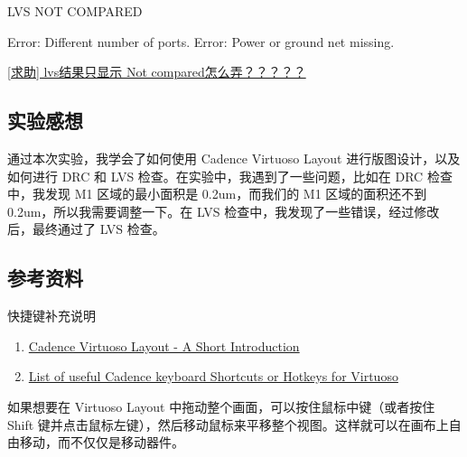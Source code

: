 \documentclass{theme-2614084}
\begin{document}
LVS NOT COMPARED

Error: Different number of ports.
Error: Power or ground net missing.

\href{https://bbs.eetop.cn/thread-965098-1-1.html}{[求助] lvs结果只显示 Not compared怎么弄？？？？？}

\subsection{实验感想}

通过本次实验，我学会了如何使用 Cadence Virtuoso Layout 进行版图设计，以及如何进行 DRC 和 LVS 检查。在实验中，我遇到了一些问题，比如在 DRC 检查中，我发现 M1 区域的最小面积是 0.2um，而我们的 M1 区域的面积还不到 0.2um，所以我需要调整一下。在 LVS 检查中，我发现了一些错误，经过修改后，最终通过了 LVS 检查。

\subsection{参考资料}

快捷键补充说明

\begin{enumerate}
  \item \href{https://www.cse.psu.edu/~kxc104/class/cse577/11s/hw/hw1/CadenceLayoutShortKey.pdf}{Cadence Virtuoso Layout - A Short Introduction}
  \item \href{https://miscircuitos.com/cadence-keyboard-shortcuts-keybinds-go-faster/}{List of useful Cadence keyboard Shortcuts or Hotkeys for Virtuoso}
\end{enumerate}

如果想要在 Virtuoso Layout 中拖动整个画面，可以按住鼠标中键（或者按住 Shift 键并点击鼠标左键），然后移动鼠标来平移整个视图。这样就可以在画布上自由移动，而不仅仅是移动器件。
\end{document}
